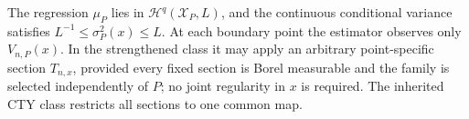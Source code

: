 The regression \(\mu_P\) lies in \(\mathcal H^q(\mathcal X_P,L)\), and the continuous conditional variance satisfies \(L^{-1}\leq\sigma_P^2(x)\leq L\).  At each boundary point the estimator observes only \(V_{n,P}(x)\).  In the strengthened class it may apply an arbitrary point-specific section \(T_{n,x}\), provided every fixed section is Borel measurable and the family is selected independently of \(P\); no joint regularity in \(x\) is required.  The inherited CTY class restricts all sections to one common map.